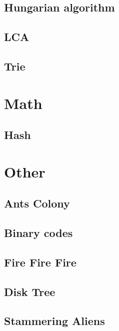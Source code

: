         \subsection{Hungarian algorithm}
                
        \subsection{LCA}
                
        \subsection{Trie}
                

\section{Math}
        \subsection{Hash}
                

\section{Other}
        \subsection{Ants Colony}
                
        \subsection{Binary codes}        
                
        \subsection{Fire Fire Fire}        
                
        \subsection{Disk Tree}        
                
        \subsection{Stammering Aliens}        
                
